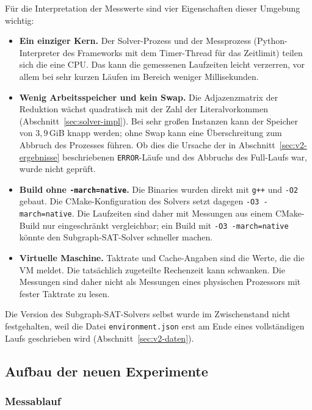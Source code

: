 \documentclass[a4paper,12pt]{article}
\theoremstyle{definition}
\begin{document}
Für die Interpretation der Messwerte sind vier Eigenschaften dieser Umgebung wichtig:

\begin{itemize}
	\item \textbf{Ein einziger Kern.} Der Solver-Prozess und der Messprozess (Python-Interpreter des Frameworks mit dem Timer-Thread für das Zeitlimit) teilen sich die eine CPU. Das kann die gemessenen Laufzeiten leicht verzerren, vor allem bei sehr kurzen Läufen im Bereich weniger Millisekunden.
	\item \textbf{Wenig Arbeitsspeicher und kein Swap.} Die Adjazenzmatrix der Reduktion wächst quadratisch mit der Zahl der Literalvorkommen (Abschnitt~\ref{sec:solver-impl}). Bei sehr großen Instanzen kann der Speicher von $3{,}9$\,GiB knapp werden; ohne Swap kann eine Überschreitung zum Abbruch des Prozesses führen. Ob dies die Ursache der in Abschnitt~\ref{sec:v2-ergebnisse} beschriebenen \texttt{ERROR}-Läufe und des Abbruchs des Full-Laufs war, wurde nicht geprüft.
	\item \textbf{Build ohne \texttt{-march=native}.} Die Binaries wurden direkt mit \texttt{g++} und \texttt{-O2} gebaut. Die CMake-Konfiguration des Solvers setzt dagegen \texttt{-O3 -march=native}. Die Laufzeiten sind daher mit Messungen aus einem CMake-Build nur eingeschränkt vergleichbar; ein Build mit \texttt{-O3 -march=native} könnte den Subgraph-SAT-Solver schneller machen.
	\item \textbf{Virtuelle Maschine.} Taktrate und Cache-Angaben sind die Werte, die die VM meldet. Die tatsächlich zugeteilte Rechenzeit kann schwanken. Die Messungen sind daher nicht als Messungen eines physischen Prozessors mit fester Taktrate zu lesen.
\end{itemize}

Die Version des Subgraph-SAT-Solvers selbst wurde im Zwischenstand nicht festgehalten, weil die Datei \texttt{environment.json} erst am Ende eines vollständigen Laufs geschrieben wird (Abschnitt~\ref{sec:v2-daten}).

\subsection{Aufbau der neuen Experimente}
\label{sec:v2-aufbau}

\subsubsection{Messablauf}
\label{sec:v2-messung}
\end{document}
